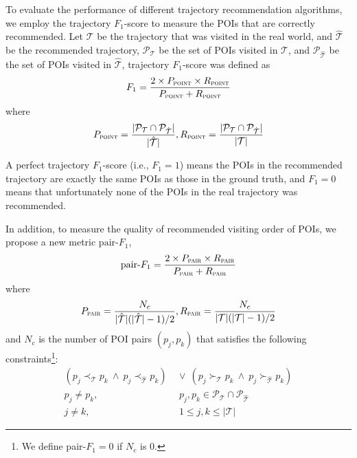 To evaluate the performance of different trajectory recommendation algorithms,
we employ the trajectory $F_1$-score\cite{ijcai15} to measure the POIs that are
correctly recommended. Let $\mathcal{T}$ be the trajectory that was visited in the real world,
and $\hat{\mathcal{T}}$ be the recommended trajectory,
$\mathcal{P}_{\mathcal{T}}$ be the set of POIs visited in $\mathcal{T}$,
and $\mathcal{P}_{\hat{\mathcal{T}}}$ be the set of POIs visited in $\hat{\mathcal{T}}$,
trajectory $F_1$-score was defined as
\begin{displaymath}
F_1= \frac{2 \times P_{\textsc{point}} \times R_{\textsc{point}}}
          {P_{\textsc{point}} + R_{\textsc{point}}}
\end{displaymath}
where
\begin{displaymath}
P_{\textsc{point}} = \frac{|\mathcal{P}_{\mathcal{T}} \cap \mathcal{P}_{\hat{\mathcal{T}}}|}
                          {|\hat{\mathcal{T}}|},
R_{\textsc{point}} = \frac{|\mathcal{P}_{\mathcal{T}} \cap \mathcal{P}_{\hat{\mathcal{T}}}|}
                          {|\mathcal{T}|}
\end{displaymath}

A perfect trajectory $F_1$-score (i.e., $F_1 = 1$) means the POIs in
the recommended trajectory are exactly the same POIs as those in the ground truth,
and $F_1 = 0$ means that unfortunately none of the POIs in the
real trajectory was recommended.

In addition, to measure the quality of recommended visiting order of POIs,
we propose a new metric $\text{pair-}F_1$,
\begin{displaymath}
\text{pair-}F_1 = \frac{2 \times P_{\textsc{pair}} \times R_{\textsc{pair}}}
                       {P_{\textsc{pair}} + R_{\textsc{pair}}}
\end{displaymath}
where
\begin{displaymath}
P_{\textsc{pair}} = \frac{N_c} {|\hat{\mathcal{T}}|(|\hat{\mathcal{T}}|-1) / 2},
R_{\textsc{pair}} = \frac{N_c} {|\mathcal{T}|(|\mathcal{T}|-1) / 2}
\end{displaymath}
and $N_c$ is the number of POI pairs $(p_j, p_k)$ that satisfies the following
constraints\footnote{We define pair-$F_1=0$ if $N_c$ is $0$.}:
\begin{align*}
    (p_j \prec_{\mathcal{T}} p_k ~\land~ p_j \prec_{\hat{\mathcal{T}}} p_k) & ~\lor~
    (p_j \succ_{\mathcal{T}} p_k ~\land~ p_j \succ_{\hat{\mathcal{T}}} p_k) \\
    p_j \ne p_k, &~~ p_j, p_k \in \mathcal{P}_{\mathcal{T}} \cap \mathcal{P}_{\hat{\mathcal{T}}} \\
    j \ne k, &~~ 1 \le j, k \le |\mathcal{T}|
\end{align*}


